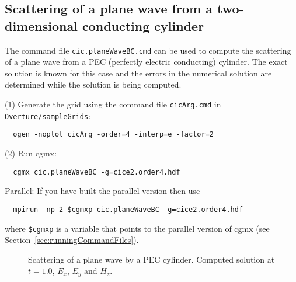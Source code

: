 \documentclass{article}
\begin{document}
\clearpage
\subsection{Scattering of a plane wave from a two-dimensional conducting cylinder} \label{sec:cyl2dScat}



The command file {\tt cic.planeWaveBC.cmd} can be used to compute the scattering
of a plane wave from a PEC (perfectly electric conducting) cylinder. The exact solution is known for this case
and the errors in the numerical solution are determined while the solution
is being computed.


\noindent (1) Generate the grid using the command file {\tt cicArg.cmd} in {\tt Overture/sampleGrids}:
\begin{verbatim}
  ogen -noplot cicArg -order=4 -interp=e -factor=2
\end{verbatim}

\noindent (2) Run cgmx: 
\begin{verbatim}
  cgmx cic.planeWaveBC -g=cice2.order4.hdf
\end{verbatim}

\noindent Parallel: If you have built the parallel version then use 
\begin{verbatim}
  mpirun -np 2 $cgmxp cic.planeWaveBC -g=cice2.order4.hdf
\end{verbatim} %
where {\tt \$cgmxp} is a variable that points to the parallel version of cgmx (see Section~\ref{sec:runningCommandFiles}).

{
\begin{figure}[hbt]
\newcommand{\figWidth}{5.5cm}
\newcommand{\trimfig}[2]{\trimFig{#1}{#2}{0.1}{0.05}{.05}{.05}}
\begin{center}
\end{center}
\caption{Scattering of a plane wave by a PEC cylinder. Computed solution at $t=1.0$, $E_x$, $E_y$ and $H_z$.}
\label{fig:cyl2dScat}
\end{figure}
}
\end{document}
